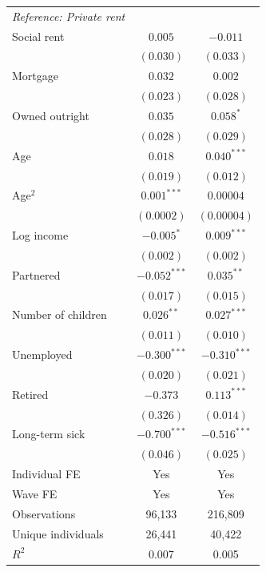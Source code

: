 \documentclass[12pt,a4paper]{article}
\begin{document}
\begin{ThreePartTable}
\begin{longtable}{lcc}
\textit{Reference: Private rent} & & \\[0.3em]
Social rent
  & $0.005$   & $-0.011$ \\
  & $(0.030)$ & $(0.033)$ \\[0.3em]
Mortgage
  & $0.032$   & $0.002$  \\
  & $(0.023)$ & $(0.028)$ \\[0.3em]
Owned outright
  & $0.035$       & $0.058^{*}$   \\
  & $(0.028)$     & $(0.029)$     \\[0.5em]
Age
  & $0.018$   & $0.040^{***}$ \\
  & $(0.019)$ & $(0.012)$     \\[0.3em]
Age$^{2}$
  & $0.001^{***}$ & $0.00004$  \\
  & $(0.0002)$    & $(0.00004)$ \\[0.3em]
Log income
  & $-0.005^{*}$ & $0.009^{***}$ \\
  & $(0.002)$    & $(0.002)$     \\[0.3em]
Partnered
  & $-0.052^{***}$ & $0.035^{**}$ \\
  & $(0.017)$      & $(0.015)$    \\[0.3em]
Number of children
  & $0.026^{**}$ & $0.027^{***}$ \\
  & $(0.011)$    & $(0.010)$     \\[0.3em]
Unemployed
  & $-0.300^{***}$ & $-0.310^{***}$ \\
  & $(0.020)$      & $(0.021)$      \\[0.3em]
Retired
  & $-0.373$  & $0.113^{***}$ \\
  & $(0.326)$ & $(0.014)$     \\[0.3em]
Long-term sick
  & $-0.700^{***}$ & $-0.516^{***}$ \\
  & $(0.046)$      & $(0.025)$      \\[0.5em]
Individual FE      & Yes    & Yes     \\
Wave FE            & Yes    & Yes     \\
\midrule
Observations       & 96{,}133 & 216{,}809 \\
Unique individuals & 26{,}441 & 40{,}422  \\
$R^{2}$            & 0.007    & 0.005     \\
\bottomrule
\end{longtable}
\end{ThreePartTable}
\end{document}

